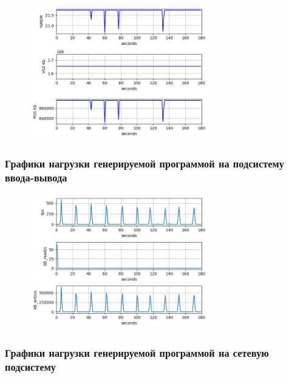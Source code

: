 \documentclass[11pt, a4paper]{article}
\begin{document}
\begin{figure}[h]
  \centering
  \includegraphics[width=0.7\textwidth]{fig-mem.png}
\end{figure}

\newpage

\subsubsection*{Графики нагрузки генерируемой программой на подсистему ввода-вывода}

\begin{figure}[h]
  \centering
  \includegraphics[width=0.7\textwidth]{fig-io.png}
\end{figure}

\newpage

\subsubsection*{Графики нагрузки генерируемой программой на сетевую подсистему}
\end{document}
